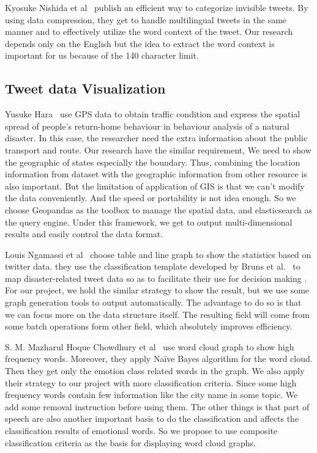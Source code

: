 Kyosuke Nishida et al~\cite{nishida2011tweet} publish an efficient way to
categorize invisible tweets. By using data compression, they get to handle
multilingual tweets in the same manner and to effectively utilize the word
context of the tweet. Our research depends only on the English but the idea
to extract the word context is important for us because of the 140 character
limit. 

\subsection{Tweet data Visualization}
Yusuke Hara~\cite{hara2015behaviour} use GPS  data to obtain traffic condition
and express  the spatial  spread  of  people’s  return-home behaviour in
behaviour analysis of a natural disaster. In this case, the researcher need
the extra information about the public transport and route. Our research have
the similar requirement, We need to show the geographic of states especially
the boundary. Thus, combining the location information from dataset with the
geographic information from other resource is also important. But the
limitation of application of GIS is that we can't modify the data
conveniently. And the speed or portability is not idea enough. So we choose
Geopandas as the toolbox to manage the spatial data, and elasticsearch as the
query engine. Under this framework, we get to output multi-dimensional
results and easily control the data format.

Louis Ngamassi et al~\cite{ngamassi2022text} choose table and line graph to
show the statistics based on twitter data. they use the classification
template developed by Bruns et al.~\cite{ngamassi2022text} to map
disaster-related tweet data so as to facilitate their use for decision
making . For our project, we hold the similar strategy to show the result,
but we use some graph generation tools to output automatically. The advantage
to do so is that we can focus more on the data structure itself. The
resulting field will come from some batch operations form other field, which
absolutely improves efficiency.

S. M. Mazharul Hoque Chowdhury et al~\cite{chowdhury2019sentiment} use word
cloud graph to show high frequency words. Moreover, they apply Naïve Bayes
algorithm for the word cloud. Then they get only the emotion class related
words in the graph. We also apply their strategy to our project with more
classification criteria. Since some high frequency words contain few
information like the city name in some topic. We add some removal instruction
before using them. The other things is that part of speech are also another
important basis to do the classification and affects the classification
results of emotional words. So we propose to use composite classification
criteria as the basis for displaying word cloud graphs.
